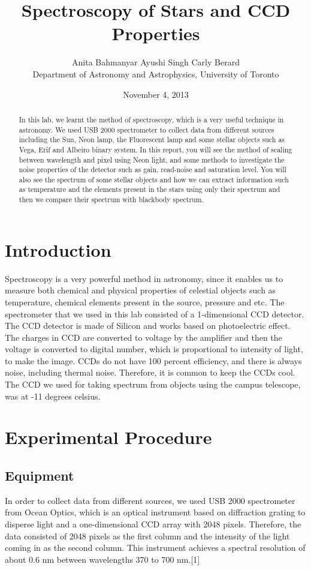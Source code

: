 \documentclass[letterpaper,12pt]{article}
\title{Spectroscopy of Stars and CCD Properties }
\author{Anita Bahmanyar \qquad Ayushi Singh \qquad Carly Berard \\Department of Astronomy and Astrophysics, University of Toronto}
\affil{\small {anita.bahmanyar@mail.utoronto.ca}}
\date{November 4, 2013}
\begin{document}
\maketitle

\begin{abstract}
\label{abstract}
In this lab, we learnt the method of spectroscopy, which is a very useful technique in astronomy. We used USB 2000 spectrometer to collect data from different sources including the Sun, Neon lamp, the Fluorescent lamp and some stellar objects such as Vega, Erif and Albeiro binary system. In this report, you will see the method of scaling between wavelength and pixel using Neon light, and some methods to investigate the noise properties of the detector such as gain, read-noise and saturation level. You will also see the spectrum of some stellar objects and how we can extract information such as temperature and the elements present in the stars using only their spectrum and then we compare their spectrum with blackbody spectrum.
\end{abstract}

\section{Introduction}
\label{sec:introduction}
Spectroscopy is a very powerful method in astronomy, since it enables us to measure both chemical and physical properties of celestial objects such as temperature, chemical elements present in the source, pressure and etc. The spectrometer that we used in this lab consisted of a 1-dimensional CCD detector. The CCD detector is made of Silicon and works based on photoelectric effect.  The charges in CCD are converted to voltage by the amplifier and then the voltage is converted to digital number, which is proportional to intensity of light, to make the image. CCDs do not have 100 percent efficiency, and there is always noise, including thermal noise. Therefore, it is common to keep the CCDs cool. The CCD we used for taking spectrum from objects using the campus telescope, was at -11 degrees celsius.

\section{Experimental Procedure}
\label{sec:experimental procedure}
\subsection{Equipment}
In order to collect data from different sources, we used USB 2000 spectrometer from Ocean Optics, which is an optical instrument based on diffraction grating to disperse light and a one-dimensional CCD array with 2048 pixels. Therefore, the data consisted of 2048 pixels as the first column and the intensity of the light coming in as the second column. This instrument achieves a spectral resolution of about 0.6 nm between wavelengths 370 to 700 nm.[1]
\end{document}
